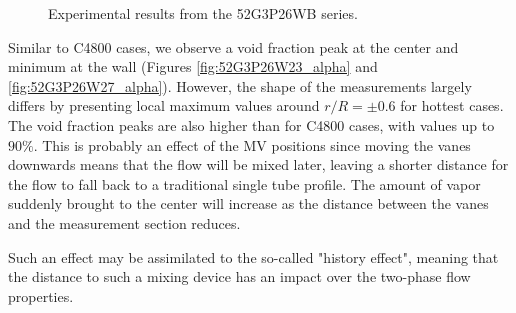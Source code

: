 \begin{figure}[!h]
\centering
{}

\caption{Experimental results from the 52G3P26WB series.}
\label{fig:exp_52G3P26W27}
\end{figure}

\npar

Similar to C4800 cases, we observe a void fraction peak at the center and minimum at the wall (Figures \ref{fig:52G3P26W23_alpha} and \ref{fig:52G3P26W27_alpha}). However, the shape of the measurements largely differs by presenting local maximum values around $r/R = \pm 0.6$ for hottest cases. The void fraction peaks are also higher than for C4800 cases, with values up to $90\%$. This is probably an effect of the MV positions since moving the vanes downwards means that the flow will be mixed later, leaving a shorter distance for the flow to fall back to a traditional single tube profile. The amount of vapor suddenly brought to the center will increase as the distance between the vanes and the measurement section reduces.

\begin{remark*}{}
Such an effect may be assimilated to the so-called "history effect", meaning that the distance to such a mixing device has an impact over the two-phase flow properties.
\end{remark*}

